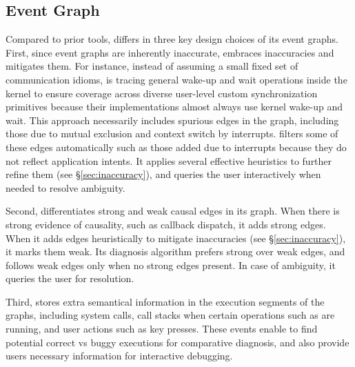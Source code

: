 \subsection{\xxx Event Graph}\label{subsec:eventgraph}

Compared to prior tools, \xxx differs in three key design choices of its
event graphs.  First, since event graphs are inherently inaccurate, \xxx
embraces inaccuracies and mitigates them.  For instance, instead of
assuming a small fixed set of communication idioms, \xxx is tracing
general wake-up and wait operations inside the kernel to ensure coverage
across diverse user-level custom synchronization primitives because their
implementations almost always use kernel wake-up and wait.  This approach
necessarily includes spurious edges in the graph, including those due to
mutual exclusion and context switch by interrupts.  \xxx filters some of
these edges automatically such as those added due to interrupts because
they do not reflect application intents.  It applies several effective
heuristics to further refine them (see \S\ref{sec:inaccuracy}), and
queries the user interactively when needed to resolve ambiguity.

Second, \xxx differentiates strong and weak causal edges in its
graph. When there is strong evidence of causality, such as callback
dispatch, it adds strong edges.  When it adds edges heuristically to
mitigate inaccuracies (see \S\ref{sec:inaccuracy}), it marks them weak.
Its diagnosis algorithm prefers strong over weak edges, and follows weak
edges only when no strong edges present.  In case of ambiguity, it queries
the user for resolution.

Third, \xxx stores extra semantical information in the execution segments
of the graphs, including system calls, call stacks when certain operations
such as  are running, and user actions such as key
presses. These events enable \xxx to find potential correct vs buggy
executions for comparative diagnosis, and also provide users necessary
information for interactive debugging.


